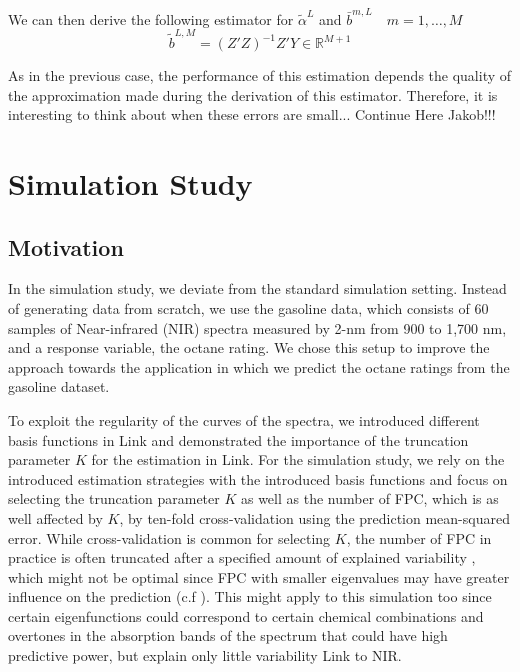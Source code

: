 \documentclass[11pt,twoside,a4paper]{article}
\begin{document}
	We can then derive the following estimator for $\tilde{\alpha}^L$ and $\bar{b}^{m,L} \quad m = 1, \dots, M$
	\begin{equation}
		\tilde{b}^{L,M} = \left(Z'Z\right)^{-1}Z'Y \in \mathbb{R}^{M+1}
	\end{equation}

	As in the previous case, the performance of this estimation depends the quality of the approximation made during the derivation of this estimator. Therefore, it is interesting to think about when these errors are small... {\color{red}Continue Here Jakob!!!}

	\nocite{alexanderian_KLexpansion_2015}
	\nocite{kokoszka_introduction_2017}
	\nocite{hsing_theoretical_2015}
	\nocite{ramsay_functional_2005}
	\nocite{horvath_inference_2012}
	\nocite{cai_prediction_2006}
	\nocite{levitin_introduction_2007}

	\section{Simulation Study}\label{Simulation}

	\subsection{Motivation}
	
	In the simulation study, we deviate from the standard simulation setting. Instead of generating data from scratch, we use the gasoline data, which consists of 60 samples of Near-infrared (NIR) spectra measured by 2-nm from 900 to 1,700 nm, and a response variable,  the octane rating. We chose this setup to improve the approach towards the application in which we  predict the octane ratings from the gasoline dataset.	
	
	To exploit the regularity of the curves of the spectra, we introduced different basis functions in {\color{green} Link} and demonstrated the importance of the truncation parameter $K$ for the estimation in {\color{green} Link}. For the simulation study, we rely on the introduced estimation strategies with the introduced basis functions and focus on selecting the truncation parameter $K$ as well as the number of FPC, which is as well affected by $K$, by ten-fold cross-validation using the prediction mean-squared error. While cross-validation is common for selecting $K$, the number of FPC in practice is often truncated after a specified amount of explained variability \cite{kokoszka_introduction_2017}, which might not be optimal since FPC with smaller eigenvalues may have greater influence on the prediction (c.f \cite{Jolliffe_1982}). This might apply to this simulation too since certain eigenfunctions could correspond to certain chemical combinations and overtones in the absorption bands of the spectrum that could have high predictive power, but explain only little variability {\color{green} Link to NIR}.
	 
\end{document}
